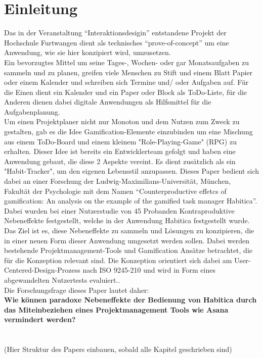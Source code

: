 \documentclass[sigconf, nonacm]{acmart}
\begin{document}
\section{Einleitung}
Das in der Veranstaltung \enquote{Interaktionsdesigin} entstandene Projekt der Hochschule Furtwangen dient als technisches \enquote{prove-of-concept} um eine Anwendung, wie sie hier konzipiert wird, umzusetzen.  \\
Ein bevorzugtes Mittel um seine Tages-, Wochen- oder gar Monatsaufgaben zu sammeln und zu planen, greifen viele Menschen zu Stift und einem Blatt Papier oder einem Kalender und schreiben sich Termine und/ oder Aufgaben auf. Für die Einen dient ein Kalender und ein Paper oder Block als ToDo-Liste, für die Anderen dienen dabei digitale Anwendungen als Hilfsmittel für die Aufgabenplanung.\\
Um einen Projektplaner nicht nur Monoton und dem Nutzen zum Zweck zu gestalten, gab es die Idee Gamification-Elemente einzubinden um eine Mischung aus einem ToDo-Board und einem kleinem "Role-Playing-Game" (RPG) zu erhalten. Dieser Idee ist bereits ein Entwicklerteam gefolgt und haben eine Anwendung gebaut, die diese 2 Aspekte vereint. Es dient zusätzlich als ein "Habit-Tracker", um den eigenen Lebensstil anzupassen. Dieses Paper bedient sich dabei an einer Forschung der Ludwig-Maximilians-Universität, München, Fakultät der Psychologie mit dem Namen \enquote{Counterproductive effetcs of gamification: An analysis \allowbreak on the example of the gamified task manager Habitica}. Dabei wurden bei einer Nutzerstudie von 45 Probanden Kontraproduktive Nebeneffekte festgestellt, welche in der Anwendung Habitica festgestellt wurde. Das Ziel ist es, diese Nebeneffekte zu sammeln und Lösungen zu konzipieren, die in einer neuen Form dieser Anwendung umgesetzt werden sollen. Dabei werden bestehende Projektmanagement-Tools und Gamification Ansätze betrachtet, die für die Konzeption relevant sind. Die Konzeption orientiert sich dabei am User-Centered-Design-Prozess nach ISO 9245-210 und wird in Form eines abgewandelten Nutzertests evaluiert..\\
Die Forschungsfrage dieses Paper lautet daher:\\
\textbf{Wie können paradoxe Nebeneffekte der Bedienung \allowbreak von Habitica durch das Miteinbeziehen eines Projektmanagement Tools wie Asana vermindert werden?}
\\
\\
\\
(Hier Struktur des Papers einbauen, sobald alle Kapitel geschrieben sind)
\end{document}
